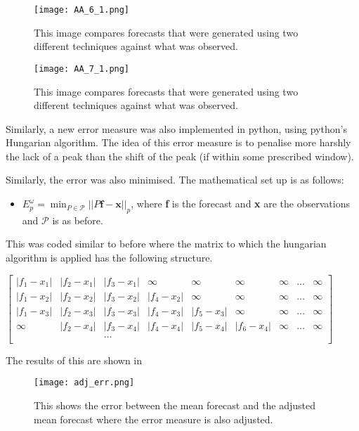 \documentclass[a4paper]{article}
\begin{document}
\begin{figure}
\centering
\texttt{[image: AA\_6\_1.png]}
\caption{\label{fig:AA_6_1} This image compares forecasts that were generated using two different techniques against what was observed. }
\end{figure}

\begin{figure}
\centering
\texttt{[image: AA\_7\_1.png]}
\caption{\label{fig:AA_7_1} This image compares forecasts that were generated using two different techniques against what was observed. }
\end{figure}

Similarly, a new error measure was also implemented in python, using python's Hungarian algorithm. The idea of this error measure is to penalise more harshly the lack of a peak than the shift of the peak (if within some prescribed window).

Similarly, the error was also minimised. The mathematical set up is as follows:
\begin{itemize}
\item $E_p^\omega = \displaystyle{\min_{P \in \mathscr{P}}||P\textbf{f}-\textbf{x}||_p}$, where \textbf{f} is the forecast and \textbf{x} are the observations and $\mathscr{P}$ is as before.
\end{itemize}

This was coded similar to before where the matrix to which the hungarian algorithm is applied has the following structure.

$\begin{bmatrix}
    |f_1 - x_1| & |f_2 - x_1| & |f_3 - x_1| & \infty  & \infty& \infty & \infty & \dots & \infty \\
    |f_1 - x_2| & |f_2 - x_2| & |f_3 - x_2| &  |f_4 - x_2| & \infty & \infty &\infty & \dots & \infty\\
    |f_1 - x_3| & |f_2 - x_3| & |f_3 - x_3| &  |f_4 - x_3|& |f_5- x_3|& \infty & \infty & \dots  & \infty\\
    \infty & |f_2 - x_4| & |f_3 - x_4| & |f_4 - x_4| &  |f_5 - x_4|& |f_6- x_4|& \infty &\dots & \infty\\
     &  & \dots &  &  & &  & \\
\end{bmatrix}$

The results of this are shown in 

\begin{figure}
\centering
\texttt{[image: adj\_err.png]}
\caption{\label{fig:adj_err} This shows the error between the mean forecast and the adjusted mean forecast where the error measure is also adjusted.}
\end{figure}
\end{document}
